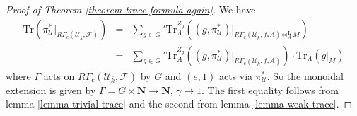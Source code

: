 \begin{proof}[Proof of Theorem \ref{theorem-trace-formula-again}]
\medskip\noindent
We have
\begin{eqnarray*}
\text{Tr}(
\pi_\mathcal{U}^*\big|_{R\Gamma_c(\mathcal{U}_{\bar k}, \mathcal{F})})
& = &
{\sum_{g \in G}}'
\text{Tr}_{\Lambda}^{Z_g}
\left(
(g,\pi_\mathcal{U}^*)
\big|_{R\Gamma_c(\mathcal{U}_{\bar k}, f_*A)\otimes_A^\mathbf{L} M}
\right) \\
& = &
{\sum_{g\in G}}'
\text{Tr}_A^{Z_g}
(
(g, \pi_\mathcal{U}^*)\big|_{R\Gamma_c(\mathcal{U}_{\bar k}, f_*A)}
)
\cdot
\text{Tr}_\Lambda(g|_M)
\end{eqnarray*}
where $\Gamma$ acts on $R\Gamma_c(\mathcal{U}_{\bar k}, \mathcal{F})$ by $G$
and $(e, 1)$ acts via $\pi_\mathcal{U}^*$. So the monoidal extension is given
by $\Gamma = G \times \mathbf{N} \to \mathbf{N}$, $\gamma \mapsto 1$. The first
equality follows from lemma \ref{lemma-trivial-trace} and the second from lemma
\ref{lemma-weak-trace}.


\end{proof}
